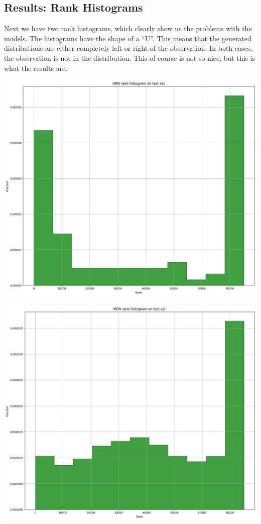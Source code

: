 \documentclass[margin=0.01in]{article}
\begin{document}
\subsection{Results: Rank Histograms}
\label{sec:org9788c8e}

Next we have two rank histograms, which clearly show us the problems with the models. The histograms have the shape of a ``U''. This means that the generated distributions are 
either completely left or right of the observation. In both cases, the observation is not in the distribution. This of course is not so nice, but this is what the results are.

\begin{center}
\includegraphics[width=.9\linewidth]{../images/ver/bnn-rank-1d.png}
\end{center}

\begin{center}
\includegraphics[width=.9\linewidth]{../images/ver/mdn-rank-1h.png}
\end{center}
\end{document}
